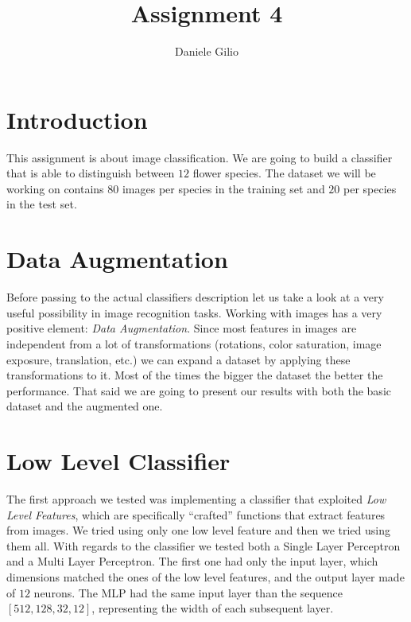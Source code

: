 \documentclass[10pt,a4paper]{report}
\author{Daniele Gilio}
\title{Assignment 4}
\begin{document}
\maketitle
\section{Introduction}
This assignment is about image classification. We are going to build a classifier that is able to distinguish between $12$ flower species. The dataset we will be working on contains $80$ images per species in the training set and $20$ per species in the test set.
\section{Data Augmentation}
Before passing to the actual classifiers description let us take a look at a very useful possibility in image recognition tasks. Working with images has a very positive element: \textit{Data Augmentation}. Since most features in images are independent from a lot of transformations (rotations, color saturation, image exposure, translation, etc.) we can expand a dataset by applying these transformations to it. Most of the times the bigger the dataset the better the performance. That said we are going to present our results with both the basic dataset and the augmented one.
\section{Low Level Classifier}
The first approach we tested was implementing a classifier that exploited \textit{Low Level Features}, which are specifically \enquote{crafted} functions that extract features from images. We tried using only one low level feature and then we tried using them all. With regards to the classifier we tested both a Single Layer Perceptron and a Multi Layer Perceptron. The first one had only the input layer, which dimensions matched the ones of the low level features, and the output layer made of $12$ neurons. The MLP had the same input layer than the sequence $[512, 128, 32, 12]$, representing the width of each subsequent layer.
\end{document}
